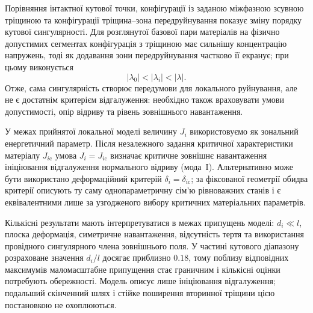 Порівняння інтактної кутової точки, конфігурації із заданою
міжфазною зсувною тріщиною та конфігурації тріщина--зона
передруйнування показує зміну порядку кутової сингулярності. Для
розглянутої базової пари матеріалів на фізично допустимих сегментах
конфігурація з тріщиною має сильнішу концентрацію напружень, тоді як
додавання зони передруйнування частково її екранує; при цьому виконується
\begin{equation*}
  |\lambda_0|<|\lambda_i|<|\lambda|.
\end{equation*}
Отже, сама сингулярність створює передумови для локального руйнування,
але не є достатнім критерієм відгалуження: необхідно також враховувати
умови допустимості, опір відриву та рівень зовнішнього навантаження.

У межах прийнятої локальної моделі величину $J_i$ використовуємо як
зональний енергетичний параметр. Після незалежного задання критичної
характеристики матеріалу $J_{i\mathrm{c}}$ умова
$J_i=J_{i\mathrm{c}}$ визначає критичне зовнішнє навантаження
ініціювання відгалуження нормального відриву (мода~I). Альтернативно
може бути використано
деформаційний критерій $\delta_i=\delta_{i\mathrm{c}}$; за фіксованої
геометрії обидва критерії описують ту саму однопараметричну сім'ю
рівноважних станів і є еквівалентними лише за узгодженого вибору
критичних матеріальних параметрів.

Кількісні результати мають інтерпретуватися в межах припущень моделі:
$d_i\ll l$, плоска деформація, симетричне навантаження, відсутність
тертя та використання провідного сингулярного члена зовнішнього поля.
У частині кутового діапазону розраховане значення $d_i/l$ досягає
приблизно $0.18$, тому поблизу відповідних максимумів маломасштабне
припущення стає граничним і кількісні оцінки потребують обережності.
Модель описує лише ініціювання відгалуження; подальший скінченний шлях і
стійке поширення вторинної тріщини цією постановкою не охоплюються.
